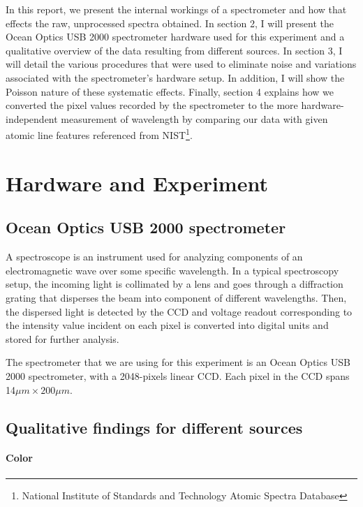 \documentclass[authoryear, 12pt,5p, times]{elsarticle}
\begin{document}
In this report, we present the internal workings of a spectrometer and how that effects the raw, unprocessed spectra obtained. In section 2, I will present the Ocean Optics USB 2000 spectrometer hardware used for this experiment and a qualitative overview of the data resulting from different sources. In section 3, I will detail the various procedures that were used to eliminate noise and variations associated with the spectrometer's hardware setup.  In addition, I will show the Poisson nature of these systematic effects. Finally, section 4 explains how we converted the pixel values recorded by the spectrometer to the more hardware-independent measurement of wavelength by comparing our data with given atomic line features referenced from NIST\footnote{National Institute of Standards and Technology Atomic Spectra Database}.
\section{Hardware and Experiment}
	\subsection{Ocean Optics USB 2000 spectrometer}
	A spectroscope is an instrument used for analyzing components of an electromagnetic wave over some specific wavelength. In a typical spectroscopy setup, the incoming light is collimated by a lens and goes through a diffraction grating that disperses the beam into component of different wavelengths.  Then, the dispersed light is detected by the CCD and %
voltage readout corresponding to the intensity value incident on each pixel is converted into digital units and stored for further analysis.  %

The spectrometer that we are using for this experiment is an Ocean Optics USB 2000 spectrometer, with a 2048-pixels linear CCD. Each pixel in the CCD spans 14$\mu m\times 200\mu m$.

	\subsection{Qualitative findings for different sources}
	\paragraph*{\textbf{Color}}
	
\end{document}
